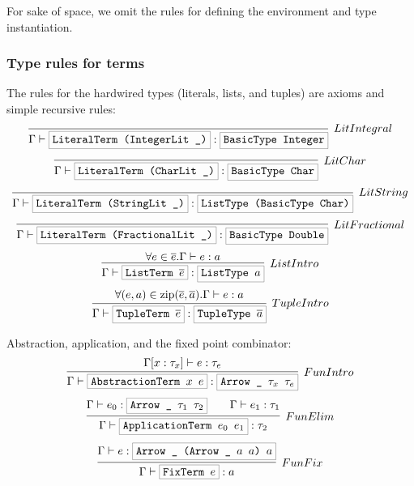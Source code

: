 \documentclass[a4paper]{scrartcl}
\newcommand{\hsterm}[1]{%
    \setlength{\fboxsep}{3pt}%
    \setlength{\fboxrule}{0.2pt}%
    \fbox{\texttt{#1}}}
\renewcommand{\vec}[1]{\overline{#1}}
\DeclareMathOperator{\zip}{zip}
\begin{document}
For sake of space, we omit the rules for defining the environment and
type instantiation.

\subsubsection{Type rules for terms}
The rules for the hardwired types (literals, lists, and tuples) are axioms
and simple recursive rules:
\begin{equation*}
\infer[LitIntegral]%
    {\Gamma \vdash \hsterm{LiteralTerm (IntegerLit \_)} : \hsterm{BasicType Integer}}%
    {}
\end{equation*}\begin{equation*}
\infer[LitChar]%
    {\Gamma \vdash \hsterm{LiteralTerm (CharLit \_)} : \hsterm{BasicType Char}}%
    {}
\end{equation*}\begin{equation*}
\infer[LitString]%
    {\Gamma \vdash \hsterm{LiteralTerm (StringLit \_)} : \hsterm{ListType (BasicType Char)}}%
    {}
\end{equation*}\begin{equation*}
\infer[LitFractional]%
    {\Gamma \vdash \hsterm{LiteralTerm (FractionalLit \_)} : \hsterm{BasicType Double}}%
    {}
\end{equation*}\begin{equation*}
\infer[ListIntro]%
    {\Gamma \vdash \hsterm{ListTerm \ensuremath{\vec{e}}} : \hsterm{ListType \ensuremath{a}}}%
    {\forall e \in \vec{e}. \Gamma \vdash e : a}
\end{equation*}\begin{equation*}
\infer[TupleIntro]%
    {\Gamma \vdash \hsterm{TupleTerm \ensuremath{\vec{e}}} : \hsterm{TupleType \ensuremath{\vec{a}}}}%
    {\forall (e,a) \in \zip(\vec{e},\vec{a}). \Gamma \vdash e : a}
\end{equation*}

Abstraction, application, and the fixed point combinator:
\begin{equation*}
\infer[FunIntro]%
    {\Gamma \vdash \hsterm{AbstractionTerm \ensuremath{x} \ensuremath{e}} : \hsterm{Arrow \_ \ensuremath{\tau_x} \ensuremath{\tau_e}}}%
    {\Gamma [x : \tau_x] \vdash e : \tau_e}%
\end{equation*}\begin{equation*}
\infer[FunElim]%
    {\Gamma \vdash \hsterm{ApplicationTerm \ensuremath{e_0} \ensuremath{e_1}} : \tau_2}%
    {\Gamma \vdash e_0 : \hsterm{Arrow \_ \ensuremath{\tau_1} \ensuremath{\tau_2}} \qquad \Gamma \vdash e_1 : \tau_1}%
\end{equation*}\begin{equation*}
\infer[FunFix]%
    {\Gamma \vdash \hsterm{FixTerm \ensuremath{e}} : \ensuremath{a}}%
    {\Gamma \vdash \ensuremath{e} : \hsterm{Arrow \_ (Arrow \_ \ensuremath{a} \ensuremath{a}) \ensuremath{a}}}
\end{equation*}
\end{document}
